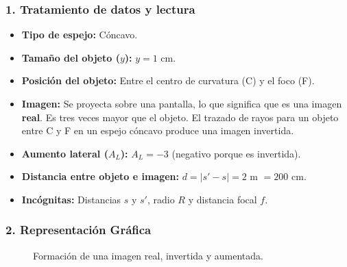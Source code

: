 \subsubsection*{1. Tratamiento de datos y lectura}
\begin{itemize}
    \item \textbf{Tipo de espejo:} Cóncavo.
    \item \textbf{Tamaño del objeto ($y$):} $y = 1$ cm.
    \item \textbf{Posición del objeto:} Entre el centro de curvatura (C) y el foco (F).
    \item \textbf{Imagen:} Se proyecta sobre una pantalla, lo que significa que es una imagen \textbf{real}. Es tres veces mayor que el objeto. El trazado de rayos para un objeto entre C y F en un espejo cóncavo produce una imagen invertida.
    \item \textbf{Aumento lateral ($A_L$):} $A_L = -3$ (negativo porque es invertida).
    \item \textbf{Distancia entre objeto e imagen:} $d = |s' - s| = 2$ m $= 200$ cm.
    \item \textbf{Incógnitas:} Distancias $s$ y $s'$, radio $R$ y distancia focal $f$.
\end{itemize}

\subsubsection*{2. Representación Gráfica}
\begin{figure}[H]
    \centering
    \caption{Formación de una imagen real, invertida y aumentada.}
\end{figure}

